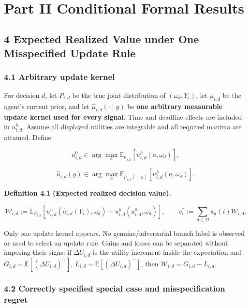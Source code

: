 \documentclass[
  11pt]{article}
\begin{document}
\section{Part II Conditional Formal
Results}\label{part-ii-conditional-formal-results}

\subsection{4 Expected Realized Value under One Misspecified Update
Rule}\label{expected-realized-value-under-one-misspecified-update-rule}

\subsubsection{4.1 Arbitrary update
kernel}\label{arbitrary-update-kernel}

For decision \(d\), let \(P_{i,d}\) be the true joint distribution of
\((\omega_d,Y_i)\), let \(\mu_{i,d}\) be the agent's current prior, and
let \(\widehat\mu_{i,d}(\cdot\mid y)\) be \textbf{one arbitrary
measurable update kernel used for every signal}. Time and deadline
effects are included in \(u^h_{i,d}\). Assume all displayed utilities
are integrable and all required maxima are attained. Define

\[a^0_{i,d}\in\arg\max_a\mathbb E_{\mu_{i,d}}[u^h_{i,d}(a,\omega_d)],\]

\[\widehat a_{i,d}(y)\in\arg\max_a\mathbb E_{\widehat\mu_{i,d}(\cdot\mid y)}[u^h_{i,d}(a,\omega_d)].\]

\textbf{Definition 4.1 (Expected realized decision value).}

\[\mathcal W_{i,d}:=\mathbb E_{P_{i,d}}\!\left[u^h_{i,d}(\widehat a_{i,d}(Y_i),\omega_d)-u^h_{i,d}(a^0_{i,d},\omega_d)\right],\qquad v_i^*:=\sum_{d\in D}\pi_d(i)\mathcal W_{i,d}.\]

Only one update kernel appears. No genuine/adversarial branch label is
observed or used to select an update rule. Gains and losses can be
separated without imposing their signs: if \(\Delta U_{i,d}\) is the
utility increment inside the expectation and
\(G_{i,d}=\mathbb E[(\Delta U_{i,d})^+]\),
\(L_{i,d}=\mathbb E[(\Delta U_{i,d})^-]\), then
\(\mathcal W_{i,d}=G_{i,d}-L_{i,d}\).

\subsubsection{4.2 Correctly specified special case and misspecification
regret}\label{correctly-specified-special-case-and-misspecification-regret}
\end{document}
